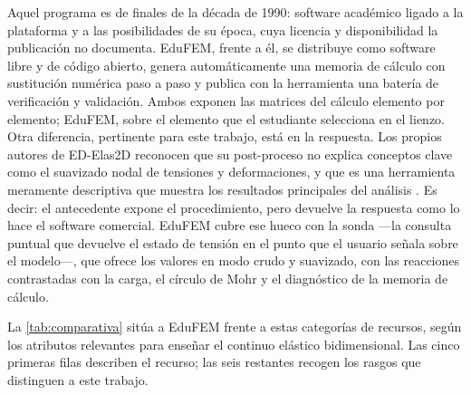 Aquel programa es de finales de la década de 1990: software académico ligado a la plataforma y a las posibilidades de su época, cuya licencia y disponibilidad la publicación no documenta. EduFEM, frente a él, se distribuye como software libre y de código abierto, genera automáticamente una memoria de cálculo con sustitución numérica paso a paso y publica con la herramienta una batería de verificación y validación. Ambos exponen las matrices del cálculo elemento por elemento; EduFEM, sobre el elemento que el estudiante selecciona en el lienzo. Otra diferencia, pertinente para este trabajo, está en la respuesta. Los propios autores de \mbox{ED-Elas2D} reconocen que su post-proceso no explica conceptos clave como el suavizado nodal de tensiones y deformaciones, y que es una herramienta meramente descriptiva que muestra los resultados principales del análisis \autocite[p.~253]{suarez1998edelas2d}. Es decir: el antecedente expone el procedimiento, pero devuelve la respuesta como lo hace el software comercial. EduFEM cubre ese hueco con la sonda —la consulta puntual que devuelve el estado de tensión en el punto que el usuario señala sobre el modelo—, que ofrece los valores en modo crudo y suavizado, con las reacciones contrastadas con la carga, el círculo de Mohr y el diagnóstico de la memoria de cálculo.

La \autoref{tab:comparativa} sitúa a EduFEM frente a estas categorías de recursos, según los atributos relevantes para enseñar el continuo elástico bidimensional. Las cinco primeras filas describen el recurso; las seis restantes recogen los rasgos que distinguen a este trabajo.

